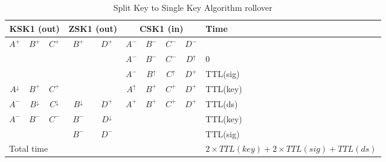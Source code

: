 \documentclass[twoside, a4paper]{article}
\begin{document}
\begin{table}[h]
\centering
\begin{tabular}{ |ccc|cc|cccc|l| }
\hline
\multicolumn{3}{|c|}{KSK1 (out)} & \multicolumn{2}{c|}{ZSK1 (out)} & \multicolumn{4}{c|}{CSK1 (in)} & Time\\
\hline
$A^{+}$ & $B^{+}$ & $C^{+}$ & $B^{+}$          & $D^{+}$          & $A^{-}$ & $B^{-}$ & $C^{-}$ & $D^{-}$               & \\
        &         &         &                  &                  & $A^{-}$ & $B^{-}$ & $C^{-}$ & $D^{\uparrow}$        & 0\\
        &         &         &                  &                  & $A^{-}$ & $B^{\uparrow}$ & $C^{\uparrow}$ & $D^{+}$ & TTL(sig)\\
$A^{\downarrow}$  & $B^{+}$ & $C^{+}$ &        &                  & $A^{\uparrow}$ & $B^{+}$ & $C^{+}$ & $D^{+}$        & TTL(key)\\
$A^{-}$  & $B^{\downarrow}$ & $C^{\downarrow}$ & $B^{\downarrow}$ &$D^{+}$ & $A^{+}$ & $B^{+}$ & $C^{+}$ & $D^{+}$               & TTL(ds)\\
$A^{-}$  & $B^{-}$ & $C^{-}$ & $B^{-}$ &$D^{\downarrow}$ &    &   &   &                                        & TTL(key)\\
        &         &         & $B^{-}$ & $D^{-}$                   &    &   &   &                                        & TTL(sig)\\
\hline
\multicolumn{9}{|l|}{Total time} & $2 \times TTL(key) + 2 \times TTL(sig) + TTL(ds)$\\
\hline
\end{tabular}
\caption{Split Key to Single Key Algorithm rollover}
\label{tab:roll_doublerrsig}
\end{table}

\newcommand{\RRh}[1]{$#1^{-}$ &}
\newcommand{\RRr}[1]{$#1^{\uparrow}$ &}
\newcommand{\RRo}[1]{$#1^{+}$ &}
\newcommand{\RRu}[1]{$#1^{\downarrow}$ &}
\newcommand{\RRn}[1]{$ $ &}
\end{document}
